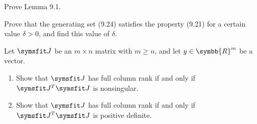 \documentclass{assignment}[2019/10/15]
\begin{document}
    \begin{problem}
        Prove Lemma 9.1.
    \end{problem}
    \begin{problem}
        Prove that the generating set (9.24) satisfies the property (9.21) for a certain value $\delta>0$, and find this value of $\delta$.
    \end{problem}
    \begin{problem}
        Let $\matr{J}$ be an $m\times n$ matrix with $m\geq n$, and let $y\in\symbb{R}^m$ be a vector.
        \begin{enumerate}
            \item Show that $\matr{J}$ has full column rank if and only if $\matr{J}^T\matr{J}$ is nonsingular.
            \item Show that $\matr{J}$ has full column rank if and only if $\matr{J}^T\matr{J}$ is positive definite.
        \end{enumerate}
    \end{problem}
\end{document}
